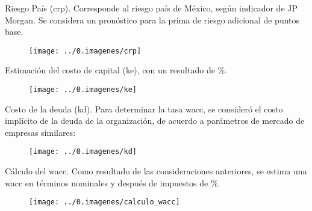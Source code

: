 \textcolor{principal}{Riesgo Pa\'is (\gls{crp}).} Corresponde al riesgo pa\'is de M\'exico, seg\'un indicador de JP Morgan. Se considera un pron\'ostico para la prima de riesgo adicional de \crpValor{} puntos base.

\begin{figure}[H]
\centering
\texttt{[image: ../0.imagenes/crp]}
\end{figure}

Estimaci\'on del costo de capital (\gls{ke}), con un resultado de \textcolor{principal}{\keValor\%.}

\begin{figure}[H]
\centering
\texttt{[image: ../0.imagenes/ke]}
\end{figure}

%
%
%

\textcolor{principal}{Costo de la deuda (\gls{kd}).} Para determinar la tasa \gls{wacc}, se consider\'o el costo impl\'icito de la deuda de la organizaci\'on, de acuerdo a par\'ametros de mercado de empresas similares:

\begin{figure}[H]
\centering
\texttt{[image: ../0.imagenes/kd]}
\end{figure}

\textcolor{principal}{C\'alculo del \gls{wacc}.} Como resultado de las consideraciones anteriores, se estima una \gls{wacc} en t\'erminos nominales y despu\'es de impuestos de \textcolor{principal}{\waccValor\%}.\\

\begin{figure}[H]
\centering
\texttt{[image: ../0.imagenes/calculo\_wacc]}
\end{figure}

